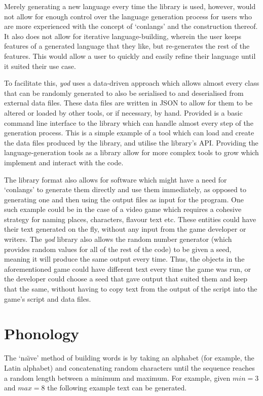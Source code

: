 \documentclass{report}
\begin{document}
   Merely generating a new language every time the library is used, however, would not allow for enough control over the language generation process for users who are more experienced with the concept of `conlangs' and the construction thereof. It also does not allow for iterative language-building, wherein the user keeps features of a generated language that they like, but re-generates the rest of the features. This would allow a user to quickly and easily refine their language until it suited their use case.
   
   To facilitate this, \textit{yod} uses a data-driven approach which allows almost every class that can be randomly generated to also be serialised to and deserialised from external data files. These data files are written in JSON to allow for them to be altered or loaded by other tools, or if necessary, by hand. Provided is a basic command line interface to the library which can handle almost every step of the generation process. This is a simple example of a tool which can load and create the data files produced by the library, and utilise the library's API. Providing the language-generation tools as a library allow for more complex tools to grow which implement and interact with the code.
   
   The library format also allows for software which might have a need for `conlangs' to generate them directly and use them immediately, as opposed to generating one and then using the output files as input for the program. One such example could be in the case of a video game which requires a cohesive strategy for naming places, characters, flavour text etc. These entities could have their text generated on the fly, without any input from the game developer or writers. The \textit{yod} library also allows the random number generator (which provides random values for all of the rest of the code) to be given a seed, meaning it will produce the same output every time. Thus, the objects in the aforementioned game could have different text every time the game was run, or the developer could choose a seed that gave output that suited them and keep that the same, without having to copy text from the output of the script into the game's script and data files.
   
   
   \chapter{Phonology}
   The `na\"{\i}ve' method of building words is by taking an alphabet (for example, the Latin alphabet) and concatenating random characters until the sequence reaches a random length between a minimum and maximum. For example, given $min = 3$ and $max = 8$ the following example text can be generated.
   
\end{document}
